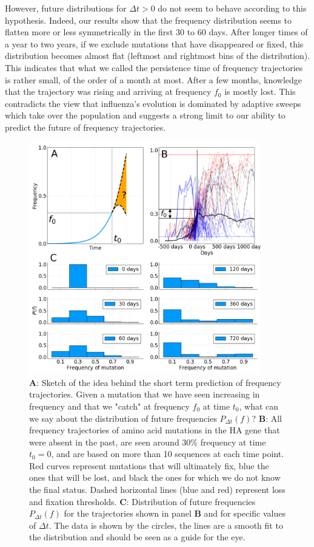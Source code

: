 \documentclass{article}
\begin{document}
	 However, future distributions for $\Delta t >0$ do not seem to behave according to this hypothesis. Indeed, our results show that the frequency distribution seems to  flatten more or less symmetrically in the first 30 to 60 days. After longer times of a year to two years, if we exclude mutations that have disappeared or fixed, this distribution becomes almost flat (leftmost and rightmost bins of the distribution). This indicates that what we called the persistence time of frequency trajectories is rather small, of the order of a month at most. After a few months, knowledge that the trajectory was rising and arriving at frequency $f_0$ is mostly lost. This contradicts the view that influenza's evolution is dominated by adaptive sweeps which take over the population and suggests a strong limit to our ability to predict the future of frequency trajectories.  

	\begin{figure}
		\centering
		\includegraphics[width=0.9\textwidth]{./Figures/Panel2.png}
		\caption{\textbf{A}: Sketch of the idea behind the short term prediction of frequency trajectories. Given a mutation that we have seen increasing in frequency and that we "catch" at frequency $f_0$ at time $t_0$, what can we say about the distribution of future frequencies $P_{\Delta t}(f)$? \textbf{B}: All frequency trajectories of amino acid mutations in the HA gene that were absent in the past, are seen around 30\% frequency at time $t_0=0$, and are based on more than 10 sequences at each time point. Red curves represent mutations that will ultimately fix, blue the ones that will be lost, and black the ones for which we do not know the final status. Dashed horizontal lines (blue and red) represent loss and fixation thresholds. \textbf{C}: Distribution of future frequencies $P_{\Delta t}(f)$ for the trajectories shown in panel \textbf{B} and for specific values of $\Delta t$. The data is shown by the circles, the lines are a smooth fit to the distribution and should be seen as a guide for the eye. }
		\label{fig:panel2}
	\end{figure}
\end{document}
